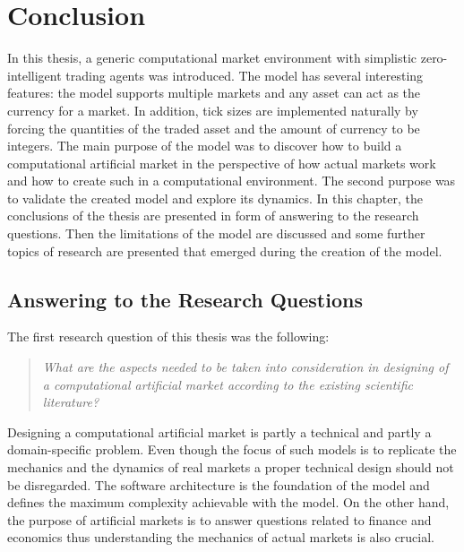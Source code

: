

\section{Conclusion}

In this thesis, a generic computational market environment with simplistic
zero-intelligent trading agents was introduced. The model has several interesting features: 
the model supports multiple markets and any asset can act as the currency
for a market. In addition, tick sizes are implemented naturally by forcing
the quantities of the traded asset and the amount of currency to be integers.
The main purpose of the model was to discover how to build a computational artificial market 
in the perspective of how actual markets work and how to create such in a computational environment. 
The second purpose was to validate the created model and explore its dynamics.
In this chapter, the conclusions of the thesis are presented in form of answering to the 
research questions. Then the limitations of the model are discussed and some further topics 
of research are presented that emerged during the creation of the model.


\subsection{Answering to the Research Questions}

The first research question of this thesis was the following:
\begin{quote}
\textit{What are the aspects needed to be taken into consideration in designing of a computational 
artificial market according to the existing scientific literature?}
\end{quote}
Designing a computational artificial market is partly a technical and partly a domain-specific 
problem. Even though the focus of such models is to replicate the mechanics and the dynamics 
of real markets a proper technical design should not be disregarded. The software architecture 
is the foundation of the model and defines the maximum complexity achievable with the model. 
On the other hand, the purpose of artificial markets is to answer questions related to 
finance and economics thus understanding the mechanics of actual markets is also crucial. 

